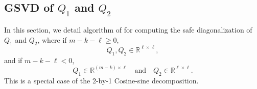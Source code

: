 
\subsection{GSVD of $Q_1$ and $Q_2$}  \label{eq:csdspecial}
In this section, we detail algorithm of  
for computing the safe diagonalization of $Q_{1}$ and $Q_{2}$, where
if $m - k - \ell \geq 0$, 
\[
Q_1, Q_2 \in \mathbb{R}^{\ell \times \ell},
\] 
and if $m - k - \ell < 0$, 
\[
Q_1 \in \mathbb{R}^{(m-k) \times \ell} 
\quad \mbox{and} \quad
Q_2 \in \mathbb{R}^{\ell \times \ell}. 
\] 
This is a special case of the 2-by-1 Cosine-sine decomposition. \cite{sutton2009computing} 

